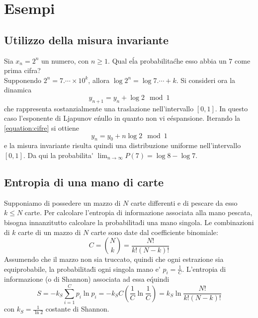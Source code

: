\documentclass[12pt, a4paper]{book}
\theoremstyle{theorem}
\begin{document}
		\section{Esempi}
			\subsection{Utilizzo della misura invariante}
				Sia $x_{n}=2^{n}$ un numero, con $n \geq 1$.
				Qual e\' la probabilita\' che esso abbia un $7$ come prima cifra?
				\\Supponendo $2^{n}=7.\cdots\times 10^{k}$, allora $\log{2^{n}}=\log{7.\cdots}+k$.
				Si consideri ora la dinamica
				\begin{equation}
					y_{n+1}=y_{n}+\log2\mod1
					\label{equation:cifre}
				\end{equation}
				che rappresenta sostanzialmente una traslazione nell'intervallo $[0,1]$.
				In questo caso l'esponente di Ljapunov e\' nullo in quanto non vi e\' espansione.
				Iterando la \ref{equation:cifre} si ottiene
				\begin{equation*}
					y_{n}=y_{0}+n\log2\mod1
				\end{equation*}
				e la misura invariante risulta quindi una distribuzione uniforme nell'intervallo $[0,1]$.
				Da qui la probabilita\' $\lim_{n\to\infty}P(7)=\log8-\log7$.
			\subsection{Entropia di una mano di carte}
				Supponiamo di possedere un mazzo di $N$ carte differenti e di pescare da esso $k\leq N$ carte.
				Per calcolare l'entropia di informazione associata alla mano pescata, bisogna innanzitutto calcolare la probabilita\' di una mano singola.
				Le combinazioni di $k$ carte di un mazzo di $N$ carte sono date dal coefficiente binomiale:
				\begin{equation}
					C=\binom{N}{k}=\frac{N!}{k!(N-k)!}
				\end{equation}
				Assumendo che il mazzo non sia truccato, quindi che ogni estrazione sia equiprobabile, la probabilita\' di ogni singola mano e\' $p_{i}=\frac{1}{C}$.
				L'entropia di informazione (o di Shannon) associata ad essa e\' quindi 
				\begin{equation*}
					S=-k_{S}\sum_{i=1}^{C}p_{i}\ln{p_{i}}=-k_{S}C\left(\frac{1}{C}\ln{\frac{1}{C}}\right)=k_{S}\ln{\frac{N!}{k!(N-k)!}}
				\end{equation*}
				con $k_{S}=\frac{1}{\ln2}$ costante di Shannon.
\end{document}
